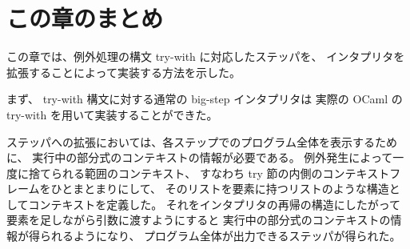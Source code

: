 \section{この章のまとめ}
\label{section:try-with__conclusion}

この章では、例外処理の構文 try-with に対応したステッパを、
インタプリタを拡張することによって実装する方法を示した。

まず、 try-with 構文に対する通常の big-step インタプリタは
実際の OCaml の try-with を用いて実装することができた。

ステッパへの拡張においては、各ステップでのプログラム全体を表示するために、
実行中の部分式のコンテキストの情報が必要である。
例外発生によって一度に捨てられる範囲のコンテキスト、
すなわち try 節の内側のコンテキストフレームをひとまとまりにして、
そのリストを要素に持つリストのような構造としてコンテキストを定義した。
それをインタプリタの再帰の構造にしたがって要素を足しながら引数に渡すようにすると
実行中の部分式のコンテキストの情報が得られるようになり、
プログラム全体が出力できるステッパが得られた。
